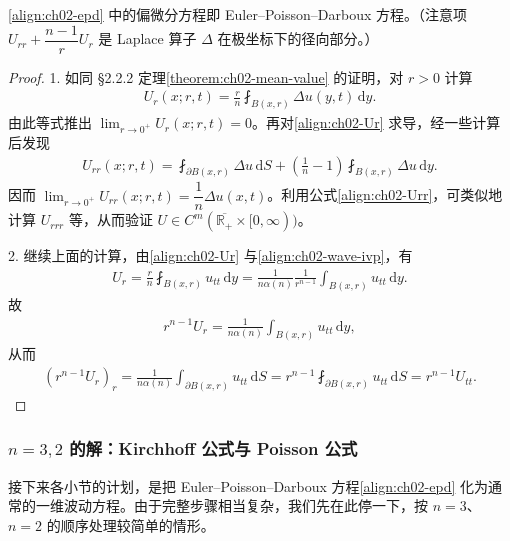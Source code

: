 \documentclass[../../main.tex]{subfiles}
\begin{document}
\noindent \eqref{align:ch02-epd} 中的偏微分方程即 Euler--Poisson--Darboux 方程。（注意项 $U_{rr}+\dfrac{n-1}{r}U_r$ 是 Laplace 算子 $\Delta$ 在极坐标下的径向部分。）

\begin{proof}
1. 如同 \S2.2.2 定理\cref{theorem:ch02-mean-value} 的证明，对 $r>0$ 计算
\begin{align}\label{align:ch02-Ur}
U_r(x;r,t)=\frac{r}{n}\fint_{B(x,r)}\Delta u(y,t)\,\mathrm{d}y.
\end{align}
由此等式推出 $\lim_{r\to 0^+}U_r(x;r,t)=0$。再对\eqref{align:ch02-Ur} 求导，经一些计算后发现
\begin{align}\label{align:ch02-Urr}
U_{rr}(x;r,t)=\fint_{\partial B(x,r)}\Delta u\,\mathrm{d}S+\left(\frac{1}{n}-1\right)\fint_{B(x,r)}\Delta u\,\mathrm{d}y.
\end{align}
因而 $\lim_{r\to 0^+}U_{rr}(x;r,t)=\dfrac{1}{n}\Delta u(x,t)$。利用公式\eqref{align:ch02-Urr}，可类似地计算 $U_{rrr}$ 等，从而验证 $U\in C^m(\overline{\mathbb{R}_+}\times[0,\infty))$。

2. 继续上面的计算，由\eqref{align:ch02-Ur} 与\eqref{align:ch02-wave-ivp}，有
\begin{align*}
U_r=\frac{r}{n}\fint_{B(x,r)}u_{tt}\,\mathrm{d}y=\frac{1}{n\alpha(n)}\frac{1}{r^{n-1}}\int_{B(x,r)}u_{tt}\,\mathrm{d}y.
\end{align*}
故
\begin{align*}
r^{n-1}U_r=\frac{1}{n\alpha(n)}\int_{B(x,r)}u_{tt}\,\mathrm{d}y,
\end{align*}
从而
\begin{align*}
(r^{n-1}U_r)_r=\frac{1}{n\alpha(n)}\int_{\partial B(x,r)}u_{tt}\,\mathrm{d}S
=r^{n-1}\fint_{\partial B(x,r)}u_{tt}\,\mathrm{d}S=r^{n-1}U_{tt}.
\end{align*}
\end{proof}

\subsubsection{$n=3,2$ 的解：Kirchhoff 公式与 Poisson 公式}

接下来各小节的计划，是把 Euler--Poisson--Darboux 方程\eqref{align:ch02-epd} 化为通常的一维波动方程。由于完整步骤相当复杂，我们先在此停一下，按 $n=3$、$n=2$ 的顺序处理较简单的情形。
\end{document}

